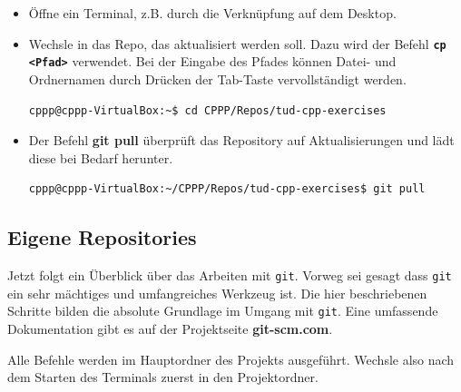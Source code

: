 \begin{itemize}
\item Öffne ein Terminal, z.B. durch die Verknüpfung auf dem Desktop.
\item Wechsle in das Repo, das aktualisiert werden soll.
Dazu wird der Befehl \textbf{\texttt{cp <Pfad>}} verwendet.
Bei der Eingabe des Pfades können Datei- und Ordnernamen durch Drücken der Tab-Taste vervollständigt werden.

\begin{lstlisting}[language=bash]
cppp@cppp-VirtualBox:~$ cd CPPP/Repos/tud-cpp-exercises
\end{lstlisting}

\item Der Befehl \textbf{git pull} überprüft das Repository auf Aktualisierungen und lädt diese bei Bedarf herunter.

\begin{lstlisting}[language=bash]
cppp@cppp-VirtualBox:~/CPPP/Repos/tud-cpp-exercises$ git pull
\end{lstlisting}
\end{itemize}

\subsection{Eigene Repositories}
Jetzt folgt ein Überblick über das Arbeiten mit \texttt{git}.
Vorweg sei gesagt dass \texttt{git} ein sehr mächtiges und umfangreiches Werkzeug ist. Die hier beschriebenen Schritte bilden die absolute Grundlage im Umgang mit \texttt{git}. Eine umfassende Dokumentation gibt es auf der Projektseite \textbf{git-scm.com}.

Alle Befehle werden im Hauptordner des Projekts ausgeführt. Wechsle also nach dem Starten des Terminals zuerst in den Projektordner.

